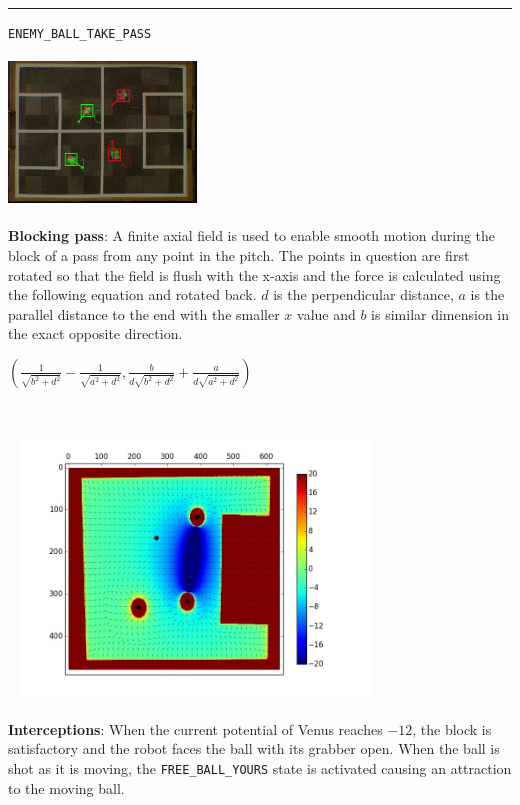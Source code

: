 \documentclass[a4paper,12pt]{article}
\begin{document}
\begin{minipage}{\linewidth}
\rule{\textwidth}{1pt}
\texttt{ENEMY\_BALL\_TAKE\_PASS}\medskip

\begin{minipage}{0.5\textwidth}
\begin{center}
\includegraphics[height=40mm,width=50mm]{v1_2.jpg}\medskip
\end{center}

\textbf{Blocking pass}: A finite axial field is used to enable smooth motion during the block of a pass from any point in the pitch. The points in question are first rotated so that the field is flush with the x-axis and the force is calculated using the following equation and rotated back. $d$ is the perpendicular distance, $a$ is the parallel distance to the end with the smaller $x$ value and $b$ is similar dimension in the exact opposite direction.

$\left(\frac{1}{\sqrt{b^2 + d^2}}-\frac{1}{\sqrt{a^2 + d^2}},\frac{b}{d\sqrt{b^2 + d^2}}+\frac{a}{d\sqrt{a^2 + d^2}}\right)$
\end{minipage}
~
\begin{minipage}{0.5\textwidth}
\includegraphics[height=70mm,width=100mm,trim=65 55 65 35,clip]{p1.jpg}\medskip

\textbf{Interceptions}: When the current potential of Venus reaches $-12$, the block is satisfactory and the robot faces the ball with its grabber open. When the ball is shot as it is moving, the \texttt{FREE\_BALL\_YOURS} state is activated causing an attraction to the moving ball.
\end{minipage}
\end{minipage}\medskip
\end{document}
